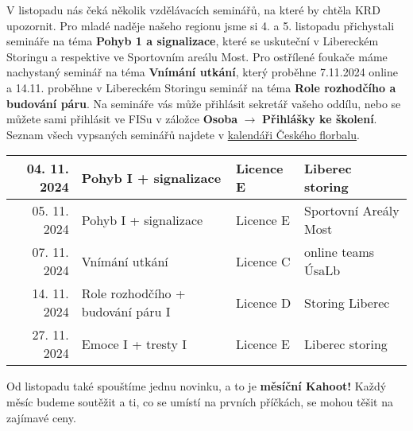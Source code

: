 \documentclass{newsletter}
\begin{document}
\pagebreak
{}
V listopadu nás čeká několik vzdělávacích seminářů, na které by chtěla KRD upozornit. Pro mladé naděje našeho regionu jsme si 4. a 5. listopadu přichystali semináře na téma \textbf{Pohyb 1 a signalizace}, které se uskuteční v Libereckém Storingu a respektive ve Sportovním areálu Most. Pro ostřílené foukače máme nachystaný seminář na téma \textbf{Vnímání utkání}, který proběhne 7.11.2024 online a 14.11. proběhne v Libereckém Storingu seminář na téma \textbf{Role rozhodčího a budování páru}. Na semináře vás může přihlásit sekretář vašeho oddílu, nebo se můžete sami přihlásit ve FISu v záložce \textbf{Osoba} $\to$ \textbf{Přihlášky ke školení}. Seznam všech vypsaných seminářů najdete v \href{https://www.ceskyflorbal.cz/calendar/?filter%5BmanagingAuthority%5D=2&filter%5BcommitteeType%5D=5}{kalendáři Českého florbalu}.

\begin{table}[h]
	\centering
	\renewcommand{\arraystretch}{2}
	\begin{tabular}{| r | l | l | l |}
	\hline
	04. 11. 2024 & Pohyb I + signalizace & Licence E & Liberec storing \\
	\hline
	05. 11. 2024 & Pohyb I + signalizace & Licence E & Sportovní Areály Most \\
	\hline
	07. 11. 2024 & Vnímání utkání & Licence C & online teams ÚsaLb \\
	\hline
	14. 11. 2024 & Role rozhodčího + budování páru I & Licence D & Storing Liberec \\
	\hline
	27. 11. 2024 & Emoce I + tresty I & Licence E & Liberec storing	\\
	\hline
	\end{tabular}
\end{table}

Od listopadu také spouštíme jednu novinku, a to je \textbf{měsíční Kahoot!} Každý měsíc budeme soutěžit a ti, co se umístí na prvních příčkách, se mohou těšit na zajímavé ceny.
\end{document}
